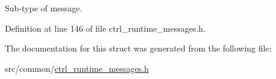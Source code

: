 Sub-\/type of message. 



Definition at line 146 of file ctrl\-\_\-runtime\-\_\-messages.\-h.



The documentation for this struct was generated from the following file\-:\begin{DoxyCompactItemize}
\item 
src/common/\hyperlink{ctrl__runtime__messages_8h}{ctrl\-\_\-runtime\-\_\-messages.\-h}\end{DoxyCompactItemize}
